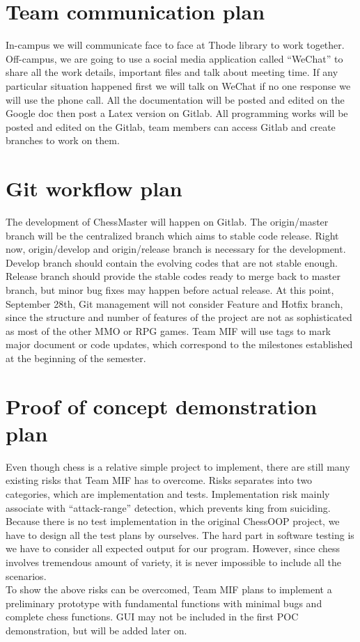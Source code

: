 \documentclass[12pt,letterpaper]{article}
\begin{document}
\section{Team communication plan}
In-campus we will communicate face to face at Thode library to work together. Off-campus, we are going to use a social media application called “WeChat” to share all the work details, important files and talk about meeting time. If any particular situation happened first we will talk on WeChat if no one response we will use the phone call. All the documentation will be posted and edited on the Google doc then post a Latex version on Gitlab. All programming works will be posted and edited on the Gitlab, team members can access Gitlab and create branches to work on them.\\

\section{Git workflow plan}
The development of ChessMaster will happen on Gitlab. The origin/master branch will be the centralized branch which aims to stable code release. Right now, origin/develop and origin/release branch is necessary for the development. Develop branch should contain the evolving codes that are not stable enough. Release branch should provide the stable codes ready to merge back to master branch, but minor bug fixes may happen before actual release. At this point, September 28th, Git management will not consider Feature and Hotfix branch, since the structure and number of features of the project are not as sophisticated as most of the other MMO or RPG games. Team MIF will use tags to mark major document or code updates, which correspond to the milestones established at the beginning of the semester.\\

\section{Proof of concept demonstration plan}
Even though chess is a relative simple project to implement, there are still many existing risks that Team MIF has to overcome. Risks separates into two categories, which are implementation and tests. Implementation risk mainly associate with “attack-range” detection, which prevents king from suiciding. \\ 
Because there is no test implementation in the original ChessOOP project, we have to design all the test plans by ourselves. The hard part in software testing is we have to consider all expected output for our program. However, since chess involves tremendous amount of variety, it is never impossible to include all the scenarios.\\
To show the above risks can be overcomed, Team MIF plans to implement a preliminary prototype with fundamental functions with minimal bugs and complete chess functions. GUI may not be included in the first POC demonstration, but will be added later on.\\
\end{document}
